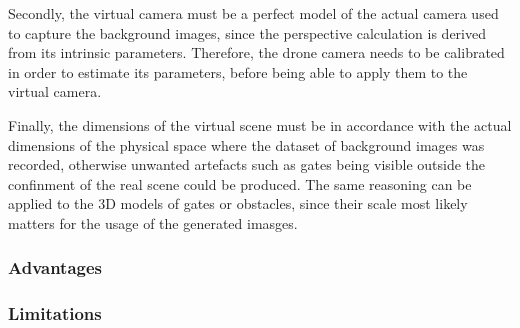 Secondly, the virtual camera must be a perfect model of the actual camera used
to capture the background images, since the perspective calculation is derived
from its intrinsic parameters. Therefore, the drone camera needs to be
calibrated in order to estimate its parameters, before being able to apply
them to the virtual camera.

Finally, the dimensions of the virtual scene must be in accordance with the
actual dimensions of the physical space where the dataset of background images
was recorded, otherwise unwanted artefacts such as gates being visible outside
the confinment of the real scene could be produced. The same reasoning can be
applied to the 3D models of gates or obstacles, since their scale most likely
matters for the usage of the generated imasges.\\

	\subsubsection{Advantages}
	\subsubsection{Limitations}
